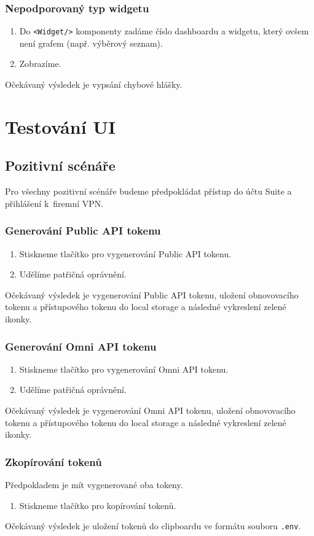 \documentclass[czech, bc, kiv, he, iso690numb, viewonly]{fasthesis} %
\begin{document}
\subsubsection{Nepodporovaný typ widgetu}
\begin{enumerate}
	\item Do \texttt{<Widget/>} komponenty zadáme číslo dashboardu a widgetu, který ovšem není grafem (např. výběrový seznam).
	\item Zobrazíme.
\end{enumerate}
Očekávaný výsledek je vypsání chybové hlášky.

\section{Testování UI}
\subsection{Pozitivní scénáře}
Pro všechny pozitivní scénáře budeme předpokládat přístup do účtu Suite a přihlášení k~firemní VPN.
\subsubsection{Generování Public API tokenu}
\begin{enumerate}
	\item Stiskneme tlačítko pro vygenerování Public API tokenu.
	\item Udělíme patřičná oprávnění.
\end{enumerate}
Očekávaný výsledek je vygenerování Public API tokenu, uložení obnovovacího tokenu a přístupového tokenu do local storage a následné vykreslení zelené ikonky.

\subsubsection{Generování Omni API tokenu}
\begin{enumerate}
	\item Stiskneme tlačítko pro vygenerování Omni API tokenu.
	\item Udělíme patřičná oprávnění.
\end{enumerate}
Očekávaný výsledek je vygenerování Omni API tokenu, uložení obnovovacího tokenu a přístupového tokenu do local storage a následné vykreslení zelené ikonky.

\subsubsection{Zkopírování tokenů}
Předpokladem je mít vygenerované oba tokeny.
\begin{enumerate}
	\item Stiskneme tlačítko pro kopírování tokenů.
\end{enumerate}
Očekávaný výsledek je uložení tokenů do clipboardu ve formátu souboru \texttt{.env}.
\end{document}
